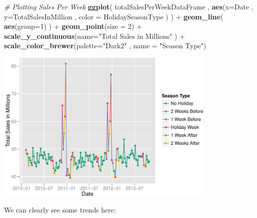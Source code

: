 \documentclass[]{article}
\newenvironment{Shaded}{\begin{snugshade}}{\end{snugshade}}
\newcommand{\KeywordTok}[1]{\textcolor[rgb]{0.13,0.29,0.53}{\textbf{{#1}}}}
\newcommand{\DataTypeTok}[1]{\textcolor[rgb]{0.13,0.29,0.53}{{#1}}}
\newcommand{\DecValTok}[1]{\textcolor[rgb]{0.00,0.00,0.81}{{#1}}}
\newcommand{\StringTok}[1]{\textcolor[rgb]{0.31,0.60,0.02}{{#1}}}
\newcommand{\CommentTok}[1]{\textcolor[rgb]{0.56,0.35,0.01}{\textit{{#1}}}}
\newcommand{\NormalTok}[1]{{#1}}
\begin{document}
\begin{Shaded}
\begin{Highlighting}[]
\CommentTok{# Plotting Sales Per Week}
\KeywordTok{ggplot}\NormalTok{( totalSalesPerWeekDataFrame , }
        \KeywordTok{aes}\NormalTok{(}\DataTypeTok{x=}\NormalTok{Date , }\DataTypeTok{y=}\NormalTok{TotalSalesInMillion , }\DataTypeTok{color =} \NormalTok{HolidaySeasonType ) ) +}\StringTok{ }
\StringTok{  }\KeywordTok{geom_line}\NormalTok{( }\KeywordTok{aes}\NormalTok{(}\DataTypeTok{group=}\DecValTok{1}\NormalTok{) ) +}\StringTok{ }
\StringTok{  }\KeywordTok{geom_point}\NormalTok{(}\DataTypeTok{size =} \DecValTok{2}\NormalTok{) +}
\StringTok{  }\KeywordTok{scale_y_continuous}\NormalTok{(}\DataTypeTok{name=}\StringTok{"Total Sales in Millions"} \NormalTok{) +}
\StringTok{  }\KeywordTok{scale_color_brewer}\NormalTok{(}\DataTypeTok{palette=}\StringTok{"Dark2"} \NormalTok{, }\DataTypeTok{name =} \StringTok{"Season Type"}\NormalTok{)}
\end{Highlighting}
\end{Shaded}

\includegraphics[width=400px]{PredictingWeeklySalesAtWalmart_files/figure-latex/plottingSalesPerWeek-1}

We can clearly see some trends here:
\end{document}
